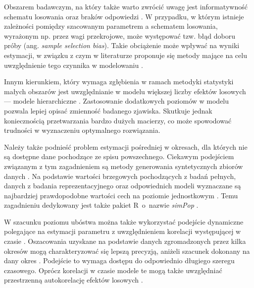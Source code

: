 Obszarem badawczym, na który także warto zwrócić uwagę jest informatywność schematu losowania oraz braków odpowiedzi \citep{pfeffermann2007}. W przypadku, w którym istnieje zależności pomiędzy szacowanym parametrem a schematem losowania, wyrażonym np. przez wagi przekrojowe, może występować tzw. błąd doboru próby (ang. \textit{sample selection bias}). Takie obciążenie może wpływać na wyniki estymacji, w związku z czym w literaturze proponuje się metody mające na celu uwzględnienie tego czynnika w modelowaniu \citep{verret2015,rao2016}.

Innym kierunkiem, który wymaga zgłębienia w ramach metodyki statystyki małych obszarów jest uwzględnianie w modelu większej liczby efektów losowych --- modele hierarchiczne \citep{jrsssa}. Zastosowanie dodatkowych poziomów w modelu pozwala lepiej opisać zmienność badanego zjawiska. Skutkuje jednak koniecznością przetwarzania bardzo dużych macierzy, co może spowodować trudności w wyznaczeniu optymalnego rozwiązania.

Należy także podnieść problem estymacji pośredniej w okresach, dla których nie są dostępne dane pochodzące ze spisu powszechnego. Ciekawym podejściem związanym z tym zagadnieniem są metody generowania syntetycznych zbiorów danych \citep{Sakshaug2010,roszka2015}. Na podstawie wartości brzegowych pochodzących z badań pełnych, danych z badania reprezentacyjnego oraz odpowiednich modeli wyznaczane są najbardziej prawdopodobne wartości cech na poziomie jednostkowym \citep{lee2009}. Temu zagadnieniu dedykowany jest także pakiet R~o~nazwie \textit{simPop} \citep{simpop2017}.

W szacunku poziomu ubóstwa można także wykorzystać podejście dynamiczne polegające na estymacji parametru z uwzględnieniem korelacji występującej w czasie \citep{raoyu1994}. Oszacowania uzyskane na podstawie danych zgromadzonych przez kilka okresów mogą charakteryzować się lepszą precyzją, aniżeli szacunek dokonany na dany okres \citep{kubacki2016}. Podejście to wymaga dostępu do odpowiednio długiego szeregu czasowego. Oprócz korelacji w czasie modele te mogą także uwzględniać przestrzenną autokorelację efektów losowych \citep{marhuenda2013}.